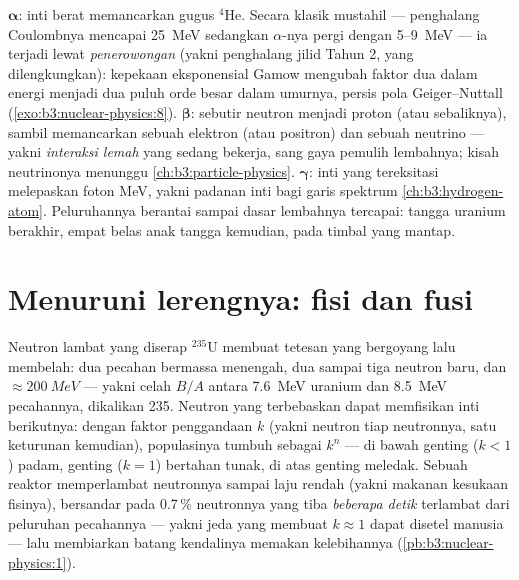 \begin{remark}\label{rem:b3:nuclear-physics:modes}
%
$\boldsymbol\alpha$: inti berat memancarkan gugus $^4$He. Secara klasik
mustahil --- penghalang Coulombnya mencapai \qty{25}{MeV} sedangkan
$\alpha$-nya pergi dengan \qty{5}{}--\qty{9}{MeV} --- ia terjadi lewat
\emph{penerowongan} (yakni penghalang jilid Tahun 2, yang dilengkungkan):
kepekaan eksponensial Gamow mengubah faktor dua dalam energi menjadi dua
puluh orde besar dalam umurnya, persis pola Geiger--Nuttall
(\cref{exo:b3:nuclear-physics:8}).
$\boldsymbol\beta$: sebutir neutron menjadi proton (atau sebaliknya), sambil memancarkan
sebuah elektron (atau positron) dan sebuah neutrino --- yakni \emph{interaksi
lemah} yang sedang bekerja, sang gaya pemulih lembahnya; kisah neutrinonya
menunggu \cref{ch:b3:particle-physics}.
$\boldsymbol\gamma$: inti yang tereksitasi melepaskan foton \unit{MeV}, yakni
padanan inti bagi garis spektrum \cref{ch:b3:hydrogen-atom}.
Peluruhannya berantai sampai dasar lembahnya tercapai: tangga uranium
berakhir, empat belas anak tangga kemudian, pada timbal yang mantap.
\end{remark}

\section{Menuruni lerengnya: fisi dan fusi}

\begin{proposition}\label{prop:b3:nuclear-physics:fission}
Neutron lambat yang diserap $^{235}$U membuat tetesan yang bergoyang lalu
membelah: dua pecahan bermassa menengah, dua sampai tiga neutron baru, dan
$\approx\qty{200}{MeV}$ --- yakni celah $B/A$ antara \qty{7.6}{MeV}
uranium dan \qty{8.5}{MeV} pecahannya, dikalikan 235.
Neutron yang terbebaskan dapat memfisikan inti berikutnya: dengan faktor
penggandaan $k$ (yakni neutron tiap neutronnya, satu keturunan
kemudian), populasinya tumbuh sebagai $k^n$ --- di bawah genting ($k < 1$)
padam, genting ($k = 1$) bertahan tunak, di atas genting meledak.
Sebuah reaktor memperlambat neutronnya sampai laju rendah (yakni makanan
kesukaan fisinya), bersandar pada 0.7\,\% neutronnya yang tiba
\emph{beberapa detik} terlambat dari peluruhan pecahannya --- yakni jeda yang membuat
$k \approx 1$ dapat disetel manusia --- lalu membiarkan batang kendalinya memakan
kelebihannya (\cref{pb:b3:nuclear-physics:1}).
\end{proposition}
\admitted

